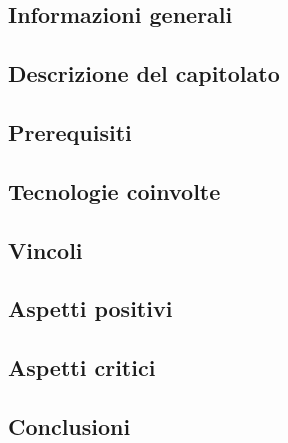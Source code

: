 \subsection{Informazioni generali}


\subsection{Descrizione del capitolato}


\subsection{Prerequisiti}


\subsection{Tecnologie coinvolte}


\subsection{Vincoli}


\subsection{Aspetti positivi}


\subsection{Aspetti critici}


\subsection{Conclusioni}

